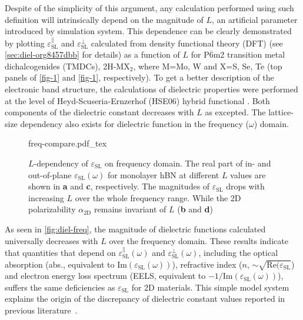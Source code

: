 %
%
Despite of the simplicity of this argument, any calculation performed
using such definition will intrinsically depend on the magnitude of
$L$, an artificial parameter introduced by simulation system. This
dependence can be clearly demonstrated by plotting
$\varepsilon^{\parallel}_{\mathrm{SL}}$ and
$\varepsilon^{\perp}_{\mathrm{SL}}$ calculated from density functional
theory (DFT) (see \autoref{sec:diel-org8457dbb} for details) as a
function of $L$ for P$\overline{6}$m2 transition metal dichalcogenides
(TMDCs), 2H-MX$_{2}$, where M=Mo, W and X=S, Se, Te (top panels of
\autoref{fig-1} and \autoref{fig-1}, respectively). To get
a better description of the electronic band structure, the
calculations of dielectric properties were performed at the level of
Heyd-Scuseria-Ernzerhof (HSE06) hybrid functional
\cite{Heyd_2003_HSe,HSE_2006_erratum}.  Both components of the
dielectric constant decreases with $L$ as excepted.  The lattice-size
dependency also exists for dielectric function in the frequency
($\omega$) domain. 
\begin{figure}[!htbp]
\centering
{freq-compare.pdf_tex}
\caption{\label{fig:diel-freq}
  $L$-dependency of $\varepsilon_{\mathrm{SL}}$ on frequency
  domain. The real part of in- and out-of-plane
  $\varepsilon_{\mathrm{SL}}(\omega)$ for monolayer hBN at different
  $L$ values are shown in \textbf{a} and \textbf{c}, respectively. The
  magnitudes of $\varepsilon_{\mathrm{SL}}$ drops with increasing $L$
  over the whole frequency range. While the 2D polarizability
  $\alpha_{\mathrm{2D}}$ remains invariant of $L$ (\textbf{b} and
  \textbf{d})}
\end{figure}

As seen in \autoref{fig:diel-freq}, the magnitude of dielectric
functions calculated universally decreases with $L$ over the frequency
domain.  These results indicate that quantities that depend on
$\varepsilon^{\parallel}_{\mathrm{SL}}(\omega)$ and
$\varepsilon^{\perp}_{\mathrm{SL}}(\omega)$, including the optical
absorption (abs., equivalent to
$\mathrm{Im}(\varepsilon_{\mathrm{SL}}(\omega))$), refractive index
($n$, $\sim{}\sqrt{\mathrm{Re}(\varepsilon_{\mathrm{SL}}}$) and
electron energy loss spectrum (EELS, equivalent to
$-1 / \mathrm{Im}(\varepsilon_{\mathrm{SL}}(\omega))$), suffers the
same deficiencies as $\varepsilon_{\mathrm{SL}}$ for 2D
materials. This simple model system explains the origin of the
discrepancy of dielectric constant values reported in previous
literature~\cite{Li_2016}.
%
%
%
%
%

